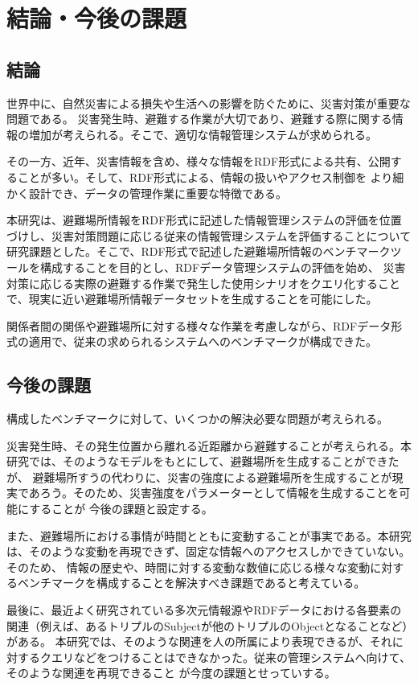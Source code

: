 ﻿%
\chapter{結論・今後の課題}

\section{結論}

世界中に、自然災害による損失や生活への影響を防ぐために、災害対策が重要な問題である。
災害発生時、避難する作業が大切であり、避難する際に関する情報の増加が考えられる。そこで、適切な情報管理システムが求められる。

その一方、近年、災害情報を含め、様々な情報をRDF形式による共有、公開することが多い。そして、RDF形式による、情報の扱いやアクセス制御を
より細かく設計でき、データの管理作業に重要な特徴である。

本研究は、避難場所情報をRDF形式に記述した情報管理システムの評価を位置づけし、災害対策問題に応じる従来の情報管理システムを評価することについて
研究課題とした。そこで、RDF形式で記述した避難場所情報のベンチマークツールを構成することを目的とし、RDFデータ管理システムの評価を始め、
災害対策に応じる実際の避難する作業で発生した使用シナリオをクエリ化することで、現実に近い避難場所情報データセットを生成することを可能にした。

関係者間の関係や避難場所に対する様々な作業を考慮しながら、RDFデータ形式の適用で、従来の求められるシステムへのベンチマークが構成できた。

\section{今後の課題}

構成したベンチマークに対して、いくつかの解決必要な問題が考えられる。

災害発生時、その発生位置から離れる近距離から避難することが考えられる。本研究では、そのようなモデルをもとにして、避難場所を生成することができたが、
避難場所すうの代わりに、災害の強度による避難場所を生成することが現実であろう。そのため、災害強度をパラメーターとして情報を生成することを可能にすることが
今後の課題と設定する。

また、避難場所における事情が時間とともに変動することが事実である。本研究は、そのような変動を再現できず、固定な情報へのアクセスしかできていない。そのため、
情報の歴史や、時間に対する変動な数値に応じる様々な変動に対するベンチマークを構成することを解決すべき課題であると考えている。

最後に、最近よく研究されている多次元情報源やRDFデータにおける各要素の関連（例えば、あるトリプルのSubjectが他のトリプルのObjectとなることなど）がある。
本研究では、そのような関連を人の所属により表現できるが、それに対するクエリなどをつけることはできなかった。従来の管理システムへ向けて、そのような関連を再現できること
が今度の課題とせっていする。
